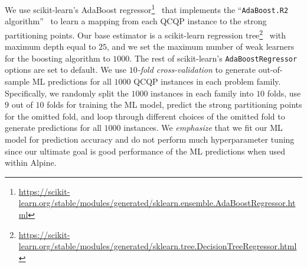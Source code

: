 \documentclass{article}
\newcommand{\pp}{partitioning points}
\begin{document}
We use scikit-learn's AdaBoost regressor\footnote{\url{https://scikit-learn.org/stable/modules/generated/sklearn.ensemble.AdaBoostRegressor.html}}~\cite{freund1997decision} that implements the ``\texttt{AdaBoost.R2} algorithm''~\cite{drucker1997improving} to learn a mapping from each QCQP instance to the strong {\pp}.
Our base estimator is a scikit-learn regression tree\footnote{\url{https://scikit-learn.org/stable/modules/generated/sklearn.tree.DecisionTreeRegressor.html}}~\cite{breiman2017classification} with maximum depth equal to $25$, and we set the maximum number of weak learners for the boosting algorithm to $1000$.
The rest of scikit-learn's \texttt{AdaBoostRegressor} options are set to default.
We use \textit{$10$-fold cross-validation} to generate out-of-sample ML predictions for all $1000$ QCQP instances in each problem family.
Specifically, we randomly split the $1000$ instances in each family into $10$ folds, use $9$ out of $10$ folds for training the ML model, predict the strong {\pp} for the omitted fold, and loop through different choices of the omitted fold to generate predictions for all $1000$ instances.
We \textit{emphasize} that we fit our ML model for prediction accuracy and do not perform much hyperparameter tuning since our ultimate goal is good performance of the ML predictions when used within Alpine. 
\end{document}
